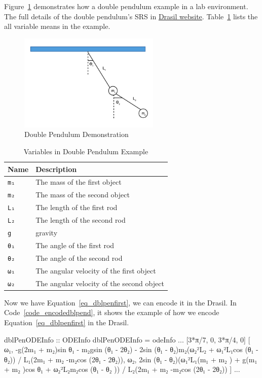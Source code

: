 Figure~\ref{fig_dblpen} demonstrates how a double pendulum example in a lab environment. The full details of the double pendulum's SRS in \href{https://jacquescarette.github.io/Drasil/examples/dblpendulum/SRS/srs/DblPendulum_SRS.html}{Drasil website}. Table~\ref{tab_dblpendes} lists the all variable means in the example.
\begin{figure}[ht]
  \centering
  \includegraphics[width=0.6\textwidth]{figures/DblPendulum.png}
  \caption{Double Pendulum Demonstration}
  \label{fig_dblpen}
\end{figure}

\begin{table}[ht]
	\begin{tabular}{ p{} p{} }
		\textbf{Name} & \textbf{Description} \\
		\toprule
		\verb|m₁| & The mass of the first object\\
    \verb|m₂| & The mass of the second object\\
		\verb|L₁| & The length of the first rod\\
		\verb|L₂| & The length of the second rod\\
		\verb|g| & gravity\\
		\verb|θ₁| & The angle of the first rod\\
		\verb|θ₂| & The angle of the second rod\\
		\verb|ω₁| & The angular velocity of the first object\\
		\verb|ω₂| & The angular velocity of the second object\\
		\bottomrule	
	\end{tabular}	
	\caption{Variables in Double Pendulum Example}	
	\label{tab_dblpendes}
\end{table}

Now we have Equation~\ref{eq_dblpenfirst}, we can encode it in the Drasil. In Code~\ref{code_encodedblpend}, it shows the example of how we encode Equation~\ref{eq_dblpenfirst} in the Drasil. 
\begin{listing}[ht]
\begin{haskell1}
dblPenODEInfo :: ODEInfo
dblPenODEInfo = odeInfo
...
[3*π/7, 0, 3*π/4, 0]
[ ω₁,
  -g(2m₁ + m₂)sin θ₁ - m₂gsin (θ₁ - 2θ₂) - 2sin (θ₁ - θ₂)m₂(ω₂²L₂ + ω₁²L₁cos (θ₁ - θ₂)) / L₁(2m₁ + m₂ -m₂cos (2θ₁ - 2θ₂)),
  ω₂,
  2sin (θ₁ - θ₂)(ω₁²L₁(m₁ + m₂ ) + g(m₁ + m₂ )cos θ₁ + ω₂²L₂m₂cos (θ₁ - θ₂ )) / L₂(2m₁ + m₂ -m₂cos (2θ₁ - 2θ₂))
]
...
\end{haskell1}
\label{code_encodedblpend}
\end{listing}


